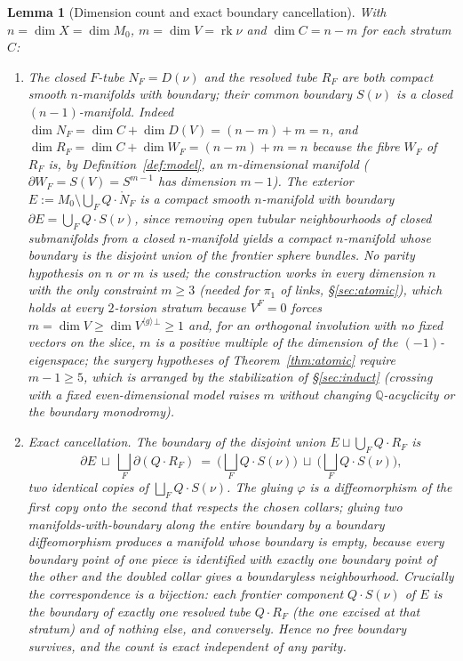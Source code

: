 \documentclass[12pt]{article}
\newtheorem{lemma}[theorem]{Lemma}
\theoremstyle{definition}
\begin{document}
\begin{lemma}[Dimension count and exact boundary cancellation]\label{lem:dimcancel}
With $n=\dim X=\dim M_0$, $m=\dim V=\operatorname{rk}\nu$ and
$\dim C=n-m$ for each stratum $C$:
\begin{enumerate}
\item[\textup{(a)}] The closed $F$-tube $N_F=D(\nu)$ and the resolved tube
$R_F$ are both compact smooth $n$-manifolds with boundary; their common
boundary $S(\nu)$ is a closed $(n-1)$-manifold. Indeed $\dim N_F=\dim C+\dim
D(V)=(n-m)+m=n$, and $\dim R_F=\dim C+\dim W_F=(n-m)+m=n$ because the fibre
$W_F$ of $R_F$ is, by \textup{Definition~\ref{def:model}}, an $m$-dimensional
manifold ($\partial W_F=S(V)=S^{m-1}$ has dimension $m-1$). The exterior
$E:=M_0\setminus\bigcup_F Q\cdot\mathring N_F$ is a compact smooth
$n$-manifold with boundary $\partial E=\bigcup_F Q\cdot S(\nu)$, since removing
open tubular neighbourhoods of closed submanifolds from a closed $n$-manifold
yields a compact $n$-manifold whose boundary is the disjoint union of the
frontier sphere bundles. No parity hypothesis on $n$ or $m$ is used; the
construction works in every dimension $n$ with the only constraint $m\ge 3$
(needed for $\pi_1$ of links, \S\ref{sec:atomic}), which holds at every
$2$-torsion stratum because $V^F=0$ forces $m=\dim V\ge\dim V^{\langle
g\rangle}{}^{\!\perp}\ge 1$ and, for an orthogonal involution with no fixed
vectors on the slice, $m$ is a positive multiple of the dimension of the
$(-1)$-eigenspace; the surgery hypotheses of \textup{Theorem~\ref{thm:atomic}}
require $m-1\ge 5$, which is arranged by the stabilization of
\textup{\S\ref{sec:induct}} (crossing with a fixed even-dimensional model
raises $m$ without changing $\mathbb{Q}$-acyclicity or the boundary monodromy).
\item[\textup{(b)}] \emph{Exact cancellation.} The boundary of the disjoint
union $E\sqcup\bigcup_F Q\cdot R_F$ is
\[
   \partial E\ \sqcup\ \bigsqcup_F \partial(Q\cdot R_F)
   \ =\ \Big(\bigsqcup_F Q\cdot S(\nu)\Big)\ \sqcup\
        \Big(\bigsqcup_F Q\cdot S(\nu)\Big),
\]
two identical copies of $\bigsqcup_F Q\cdot S(\nu)$. The gluing $\varphi$ is a
diffeomorphism of the first copy onto the second that respects the chosen
collars; gluing two manifolds-with-boundary along the \emph{entire} boundary by
a boundary diffeomorphism produces a manifold whose boundary is empty, because
every boundary point of one piece is identified with exactly one boundary point
of the other and the doubled collar gives a boundaryless neighbourhood. Crucially
the correspondence is a bijection: each frontier component $Q\cdot S(\nu)$ of
$E$ is the boundary of exactly one resolved tube $Q\cdot R_F$ (the one excised at
that stratum) and of nothing else, and conversely. Hence \emph{no} free boundary
survives, and the count is exact independent of any parity.
\end{enumerate}
\end{lemma}
\end{document}

